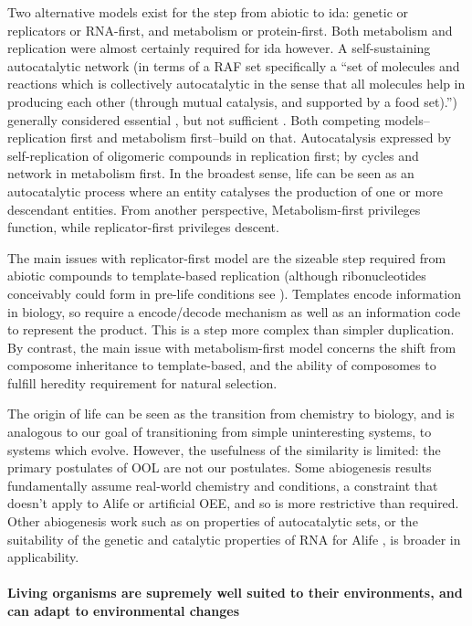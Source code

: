 \begin{mdframed}[style=box, frametitle={The orgins of life}]
Two alternative models exist for the step from abiotic to \gls{ida}: genetic or replicators or RNA-first, and metabolism or protein-first. Both metabolism and replication were almost certainly required for \gls{ida} however. A self-sustaining autocatalytic network (in terms of a RAF set specifically a ``set of molecules and reactions which is collectively autocatalytic in the sense that all molecules help in producing each other (through mutual catalysis, and supported by a food set).'') generally considered essential \parencite{Pross2013}, but not sufficient \parencite{Hordijk2011}. Both competing models--replication first and metabolism first--build on that. Autocatalysis expressed by self-replication of oligomeric compounds in replication first; by cycles and network in metabolism first. In the broadest sense, life can be seen as an autocatalytic process where an entity catalyses the production of one or more descendant entities.
From another perspective, Metabolism-first privileges function, while replicator-first privileges descent.

The main issues with replicator-first model are the sizeable step required from abiotic compounds to template-based replication (although ribonucleotides conceivably could form in pre-life conditions see \parencite{Powner2009}). Templates encode information in biology, so require a encode/decode mechanism as well as an information code to represent the product. This is a step more complex than simpler duplication. By contrast, the main issue with metabolism-first model concerns the shift from composome inheritance to template-based, and the ability of composomes to fulfill heredity requirement for natural selection.

The origin of life can be seen as the transition from chemistry to biology, and is analogous to our goal of transitioning from simple uninteresting systems, to systems which evolve. However, the usefulness of the similarity is limited: the primary postulates of OOL are not our postulates. Some abiogenesis results fundamentally assume real-world chemistry and
conditions, a constraint that doesn't apply to Alife or artificial OEE, and so is more restrictive than required. Other abiogenesis work such as on properties of autocatalytic sets, or the suitability of the genetic and catalytic properties of RNA for Alife \parencite{Cheng2010}, is broader in applicability.
\end{mdframed}

\paragraph{Living organisms are supremely well suited to their environments, and can adapt to environmental changes}

